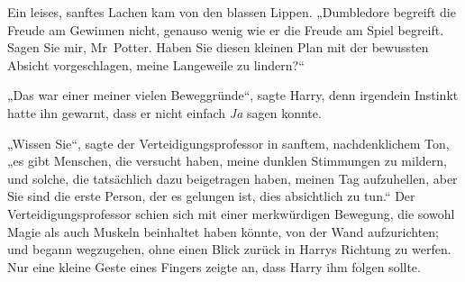 Ein leises, sanftes Lachen kam von den blassen Lippen. „Dumbledore begreift die Freude am Gewinnen nicht, genauso wenig wie er die Freude am Spiel begreift. Sagen Sie mir, Mr~Potter. Haben Sie diesen kleinen Plan mit der bewussten Absicht vorgeschlagen, meine Langeweile zu lindern?“

„Das war einer meiner vielen Beweggründe“, sagte Harry, denn irgendein Instinkt hatte ihn gewarnt, dass er nicht einfach \emph{Ja} sagen konnte.

„Wissen Sie“, sagte der Verteidigungsprofessor in sanftem, nachdenklichem Ton, „es gibt Menschen, die versucht haben, meine dunklen Stimmungen zu mildern, und solche, die tatsächlich dazu beigetragen haben, meinen Tag aufzuhellen, aber Sie sind die erste Person, der es gelungen ist, dies absichtlich zu tun.“ Der Verteidigungsprofessor schien sich mit einer merkwürdigen Bewegung, die sowohl Magie als auch Muskeln beinhaltet haben könnte, von der Wand aufzurichten; und begann wegzugehen, ohne einen Blick zurück in Harrys Richtung zu werfen. Nur eine kleine Geste eines Fingers zeigte an, dass Harry ihm folgen sollte.

